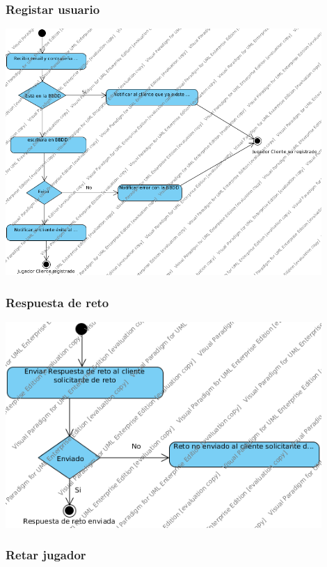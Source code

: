 \documentclass[a4paper,11pt,oneside]{article}
\begin{document}
\subsubsection{Registar usuario}

\includegraphics[width=0.9\textwidth]{img/ms_RegistrarUsuarioServidor.png}\\[1cm]

\subsubsection{Respuesta de reto}

\includegraphics[width=0.9\textwidth]{img/ms_RespuestaRetoServidor.png}\\[1cm]

\subsubsection{Retar jugador}
\end{document}
